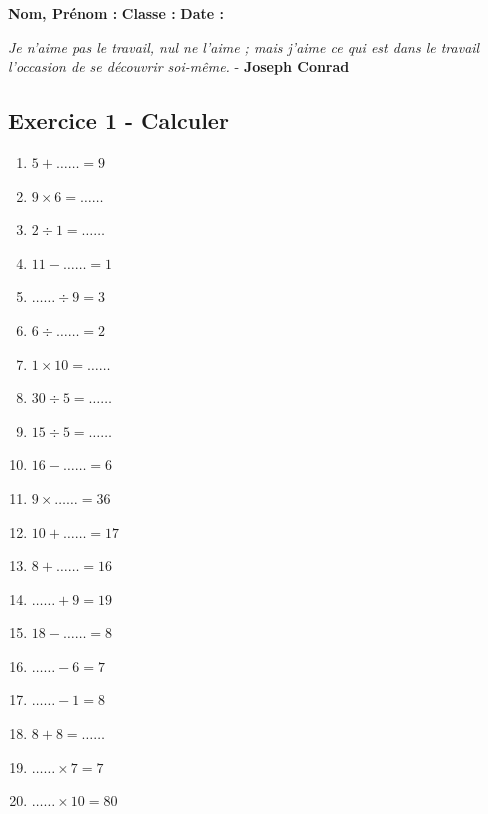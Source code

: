 



\textbf{Nom, Prénom :} \hspace{8cm} \textbf{Classe :} \hspace{3cm} \textbf{Date :}\\
\vspace{-0.8cm}
\begin{center}
  \textit{Je n'aime pas le travail, nul ne l'aime ; mais j'aime ce qui est dans le travail l'occasion de se découvrir soi-même.}  - \textbf{Joseph Conrad}
\end{center}
\vspace{-0.8cm}

\subsection*{Exercice 1 - Calculer}

\begin{multicols}{3}\noindent
    \begin{enumerate}
      \item $5 + \ldots\ldots = 9$
      \item $9 \times 6 = \ldots\ldots$
      \item $2 \div 1 = \ldots\ldots$
      \item $11 - \ldots\ldots = 1$
      \item $\ldots\ldots \div 9 = 3$
      \item $6 \div \ldots\ldots = 2$
      \item $1 \times 10 = \ldots\ldots$
      \item $30 \div 5 = \ldots\ldots$
      \item $15 \div 5 = \ldots\ldots$
      \item $16 - \ldots\ldots = 6$
      \item $9 \times \ldots\ldots = 36$
      \item $10 + \ldots\ldots = 17$
      \item $8 + \ldots\ldots = 16$
      \item $\ldots\ldots + 9 = 19$
      \item $18 - \ldots\ldots = 8$
      \item $\ldots\ldots - 6 = 7$
      \item $\ldots\ldots - 1 = 8$
      \item $8 + 8 = \ldots\ldots$
      \item $\ldots\ldots \times 7 = 7$
      \item $\ldots\ldots \times 10 = 80$
    \end{enumerate}
  \end{multicols}

